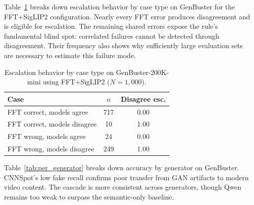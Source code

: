 \documentclass{ieeeaccess}
\begin{document}
Table~\ref{tab:escalation} breaks down escalation behavior by case type on GenBuster for
the FFT+SigLIP2 configuration. Nearly every FFT error produces disagreement and is
eligible for escalation. The remaining shared errors expose the rule's fundamental blind
spot: correlated failures cannot be detected through disagreement. Their frequency also
shows why sufficiently large evaluation sets are necessary to estimate this failure mode.

\begin{table}[h]
\centering
\caption{Escalation behavior by case type on GenBuster-200K-mini using FFT+SigLIP2 ($N{=}1{,}000$).}
\label{tab:escalation}
\begin{tabular}{lcc}
\toprule
Case & $n$ & Disagree esc. \\
\midrule
FFT correct, models agree    & 717 & 0.00 \\
FFT correct, models disagree &  10 & 1.00 \\
FFT wrong, models agree      &  24 & 0.00 \\
FFT wrong, models disagree   & 249 & 1.00 \\
\bottomrule
\end{tabular}
\end{table}

Table~\ref{tab:per_generator} breaks down accuracy by generator on GenBuster.
CNNSpot's low fake recall confirms poor transfer from GAN artifacts to modern video
content. The cascade is more consistent across generators, though Qwen remains too weak
to surpass the semantic-only baseline.


\begin{table}[h]
\centering
\caption{Per-generator detection accuracy on a 400-sample stratified subset of GenBuster-200K-mini. These descriptive results are separate from the $N{=}1{,}000$ aggregate evaluation.}
\label{tab:per_generator}
\end{table}
\end{document}
